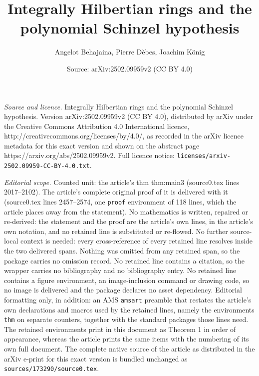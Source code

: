 \documentclass[10pt,a4paper]{amsart}
\title{Integrally Hilbertian rings and \break the polynomial Schinzel hypothesis}
\author{Angelot Behajaina, Pierre D\`ebes, Joachim K\"onig}
\date{Source: arXiv:2502.09959v2 (CC BY 4.0)}
\begin{document}
\maketitle

\noindent\emph{Source and licence.} Integrally Hilbertian rings and \break the polynomial Schinzel hypothesis. Version arXiv:2502.09959v2 (CC BY 4.0), distributed by arXiv under the Creative Commons Attribution 4.0 International licence, http://creativecommons.org/licenses/by/4.0/, as recorded in the arXiv licence metadata for this exact version and shown on the abstract page https://arxiv.org/abs/2502.09959v2. Full licence notice: \texttt{licenses/arxiv-2502.09959-CC-BY-4.0.txt}.\par\smallskip

\noindent\textit{Editorial scope.} Counted unit: the article's thm thm:main3 (source0.tex lines 2017--2102). The article's complete original proof of it is delivered with it (source0.tex lines 2457--2574, one \texttt{proof} environment of 118 lines, which the article places away from the statement). No mathematics is written, repaired or re-derived: the statement and the proof are the article's own lines, in the article's own notation, and no retained line is substituted or re-flowed.  No further source-local context is needed: every cross-reference of every retained line resolves inside the two delivered spans.  Nothing was omitted from any retained span, so the package carries no omission record.  No retained line contains a citation, so the wrapper carries no bibliography and no bibliography entry.  No retained line contains a figure environment, an image-inclusion command or drawing code, so no image is delivered and the package declares no asset dependency.  Editorial formatting only, in addition: an AMS \texttt{amsart} preamble that restates the article's own declarations and macros used by the retained lines, namely the environments \texttt{thm} on separate counters, together with the standard packages those lines need.  The retained environments print in this document as Theorem 1 in order of appearance, whereas the article prints the same items with the numbering of its own full document.  The complete native source of the article as distributed in the arXiv e-print for this exact version is bundled unchanged as \texttt{sources/173290/source0.tex}.
\end{document}
